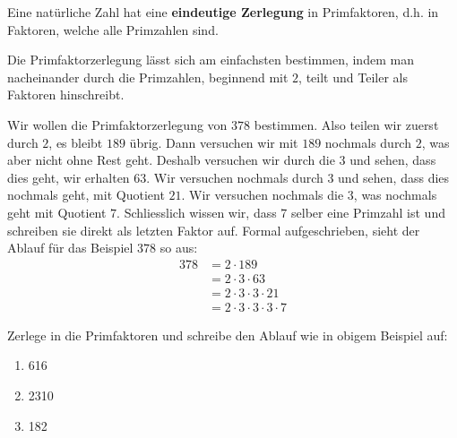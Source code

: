 \begin{satz}[Primfaktorzerlegung]
Eine natürliche Zahl hat eine \textbf{eindeutige Zerlegung} in Primfaktoren, d.h. in Faktoren, welche alle Primzahlen sind.
\end{satz}

Die Primfaktorzerlegung lässt sich am einfachsten bestimmen, indem man nacheinander durch die Primzahlen, beginnend mit $2$, teilt und Teiler als Faktoren hinschreibt.
\begin{ex}
Wir wollen die Primfaktorzerlegung von $378$ bestimmen. Also teilen wir zuerst durch $2$, es bleibt $189$ übrig. Dann versuchen wir mit $189$ nochmals durch $2$, was aber nicht ohne Rest geht. Deshalb versuchen wir durch die $3$ und sehen, dass dies geht, wir erhalten 63. Wir versuchen nochmals durch $3$ und sehen, dass dies nochmals geht, mit Quotient $21$. Wir versuchen nochmals die 3, was nochmals geht mit Quotient $7$. Schliesslich wissen wir, dass 7 selber eine Primzahl ist und schreiben sie direkt als letzten Faktor auf. Formal aufgeschrieben, sieht der Ablauf für das Beispiel $378$ so aus:
\begin{align*}
378&=2\cdot 189\\
&=2\cdot 3\cdot 63\\
&=2\cdot 3 \cdot 3\cdot 21\\
&=2\cdot 3 \cdot 3 \cdot 3 \cdot 7
\end{align*}

\end{ex}
\begin{aufgabe}[Primfaktorzerlegung]
Zerlege in die Primfaktoren und schreibe den Ablauf wie in obigem Beispiel auf:
\begin{center}
\begin{enumerate}[label=\alph*)]
\item 616
\item 2310
\item 182
\end{enumerate}
\end{center}
\end{aufgabe}

